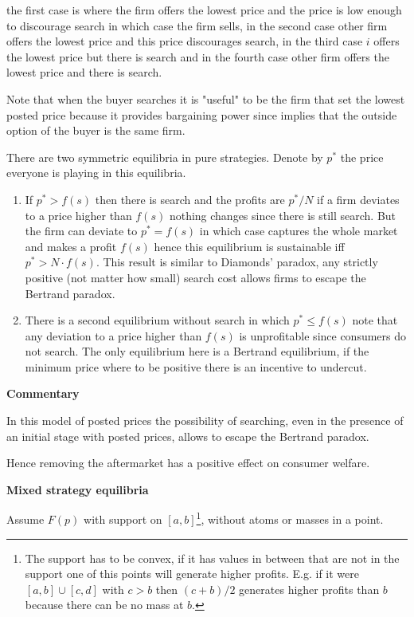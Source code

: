 \documentclass[12pt]{article}
\theoremstyle{plain}
\theoremstyle{plain}
\begin{document}
the first case is where the  firm offers the lowest price and the price is low enough to discourage search in which case the firm sells, in the second case other firm offers the lowest price and this price discourages search, in the third 
case $i$ offers the lowest price but there is search and in the fourth case other firm offers the lowest price and there is search. 

Note that when the buyer searches it is "useful" to be the firm that set the lowest posted price because it provides bargaining power since implies that the outside option of the buyer is the same firm.  

There are two symmetric equilibria in pure strategies. Denote by $p^*$ the price everyone is playing in this equilibria. 
\begin{enumerate}
    \item If $p^* >f(s)$ then there is search and the profits are $p^*/N$ if a firm deviates to a price higher than $f(s)$ nothing changes since there is still search. But the firm can deviate to $p^*=f(s)$ in which case captures the whole market and makes a profit $f(s)$ hence this equilibrium is sustainable iff $p^*> N \cdot f(s)$. This result is similar to Diamonds' paradox, any strictly positive (not matter how small) search cost allows firms to escape the Bertrand paradox. 
    
    \item There is a second equilibrium without search in which $p^*\leq f(s)$ note that any deviation to a price higher than $f(s)$ is unprofitable since consumers do not search. The only equilibrium here is a Bertrand equilibrium, if the minimum price where to be positive there is an incentive to undercut. 
\end{enumerate}

\textbf{Commentary}

In this model of posted prices the possibility of searching, even in the presence of an initial stage with posted prices,  allows to escape the Bertrand paradox. 

Hence removing the aftermarket has a positive effect on consumer welfare. 


\textbf{Mixed strategy equilibria }


Assume $F(p)$ with support on $[a,b]$\footnote{The support has to be convex, if it has values in between that are not in the support one of this points will generate higher profits. E.g. if it were $[a,b] \cup [c,d]$ with $c>b$ then $(c+b)/2$ generates higher profits than $b$ because there can be no mass at $b$.}, without atoms or masses in a point.
\end{document}
